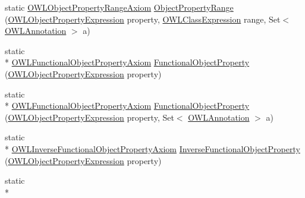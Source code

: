 \begin{DoxyCompactItemize}
\item 
static \hyperlink{interfaceorg_1_1semanticweb_1_1owlapi_1_1model_1_1_o_w_l_object_property_range_axiom}{O\-W\-L\-Object\-Property\-Range\-Axiom} \hyperlink{classorg_1_1semanticweb_1_1owlapi_1_1apibinding_1_1_o_w_l_functional_syntax_factory_a02627d7d495fc47ba8b23cdbae155dd5}{Object\-Property\-Range} (\hyperlink{interfaceorg_1_1semanticweb_1_1owlapi_1_1model_1_1_o_w_l_object_property_expression}{O\-W\-L\-Object\-Property\-Expression} property, \hyperlink{interfaceorg_1_1semanticweb_1_1owlapi_1_1model_1_1_o_w_l_class_expression}{O\-W\-L\-Class\-Expression} range, Set$<$ \hyperlink{interfaceorg_1_1semanticweb_1_1owlapi_1_1model_1_1_o_w_l_annotation}{O\-W\-L\-Annotation} $>$ a)
\item 
static \\*
\hyperlink{interfaceorg_1_1semanticweb_1_1owlapi_1_1model_1_1_o_w_l_functional_object_property_axiom}{O\-W\-L\-Functional\-Object\-Property\-Axiom} \hyperlink{classorg_1_1semanticweb_1_1owlapi_1_1apibinding_1_1_o_w_l_functional_syntax_factory_a52ef162e2b7088ccdd2d995a040872a9}{Functional\-Object\-Property} (\hyperlink{interfaceorg_1_1semanticweb_1_1owlapi_1_1model_1_1_o_w_l_object_property_expression}{O\-W\-L\-Object\-Property\-Expression} property)
\item 
static \\*
\hyperlink{interfaceorg_1_1semanticweb_1_1owlapi_1_1model_1_1_o_w_l_functional_object_property_axiom}{O\-W\-L\-Functional\-Object\-Property\-Axiom} \hyperlink{classorg_1_1semanticweb_1_1owlapi_1_1apibinding_1_1_o_w_l_functional_syntax_factory_a73208bb24d3bb173a63c03ccccde5ef3}{Functional\-Object\-Property} (\hyperlink{interfaceorg_1_1semanticweb_1_1owlapi_1_1model_1_1_o_w_l_object_property_expression}{O\-W\-L\-Object\-Property\-Expression} property, Set$<$ \hyperlink{interfaceorg_1_1semanticweb_1_1owlapi_1_1model_1_1_o_w_l_annotation}{O\-W\-L\-Annotation} $>$ a)
\item 
static \\*
\hyperlink{interfaceorg_1_1semanticweb_1_1owlapi_1_1model_1_1_o_w_l_inverse_functional_object_property_axiom}{O\-W\-L\-Inverse\-Functional\-Object\-Property\-Axiom} \hyperlink{classorg_1_1semanticweb_1_1owlapi_1_1apibinding_1_1_o_w_l_functional_syntax_factory_a253a3588174f5a7587710f82666d2598}{Inverse\-Functional\-Object\-Property} (\hyperlink{interfaceorg_1_1semanticweb_1_1owlapi_1_1model_1_1_o_w_l_object_property_expression}{O\-W\-L\-Object\-Property\-Expression} property)
\item 
static \\*

\end{DoxyCompactItemize}

